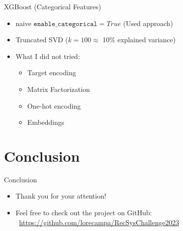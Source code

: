 \documentclass{beamer}
\begin{document}
\begin{frame}{XGBoost (Categorical Features)}
  \begin{itemize}
    \item naive $\texttt{enable\_categorical}=True$ (Used approach)
    \item Truncated SVD ($k=100 \approx$ 10\% explained variance)
    \item What I did not tried:
    \begin{itemize}
      \item Target encoding
      \item Matrix Factorization
      \item One-hot encoding
      \item Embeddings
    \end{itemize}
  \end{itemize}
\end{frame}


\section{Conclusion}

\begin{frame}{Conclusion}
\begin{itemize}
    \item Thank you for your attention!
    \item Feel free to check out the project on GitHub: \\
    \faGithub\ \url{https://github.com/lorecampa/RecSysChallenge2023}
\end{itemize}
\end{frame}
\end{document}
